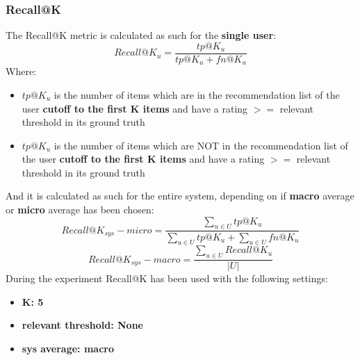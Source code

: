 \documentclass[11pt]{article}
\begin{document}
\subsubsection{Recall@K}\label{subsubsec:rec-k}
The Recall@K metric is calculated as such for the \textbf{single user}:
\hfill\break
\hfill\break
    \[
        Recall@K_u = \frac{tp@K_u}{tp@K_u + fn@K_u}
    \]
\hfill\break
\hfill\break
    Where:
\begin{itemize}
    \item $tp@K_u$ is the number of items which are in the recommendation list of the user
      \textbf{cutoff to the first K items} and have a rating $>=$ relevant threshold in its ground truth
    \item $tp@K_u$ is the number of items which are NOT in the recommendation list of the user
      \textbf{cutoff to the first K items} and have a rating $>=$ relevant threshold in its ground truth
\end{itemize}
\hfill\break
\hfill\break
And it is calculated as such for the entire system, depending on if \textbf{macro} average or \textbf{micro} average
has been chosen:
\hfill\break
\hfill\break
    \[
        Recall@K_{sys} - micro = \frac{\sum_{u \in U} tp@K_u}{\sum_{u \in U} tp@K_u + \sum_{u \in U} fn@K_u}
    \]
\hfill\break
\hfill\break
    \[
        Recall@K_{sys} - macro = \frac{\sum_{u \in U} Recall@K_u}{|U|}
    \]
\hfill\break
\hfill\break
During the experiment Recall@K has been used with the following settings:
\begin{itemize}
    \item \textbf{K: 5 }
    \item \textbf{relevant threshold: None }
    \item \textbf{sys average: macro }
\end{itemize}
\hfill\break
\hfill\break

\end{document}
